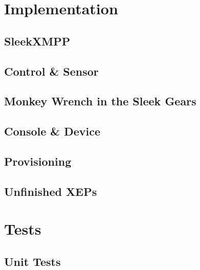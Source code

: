 \documentclass{sig-alternate}
\begin{document}
\section{Implementation}




\subsection{SleekXMPP}



\subsection{Control \& Sensor}



\subsection{Monkey Wrench in the Sleek Gears}



\subsection{Console \& Device}



\subsection{Provisioning}



\subsection{Unfinished XEPs}



\section{Tests}

\subsection{Unit Tests}
\end{document}
